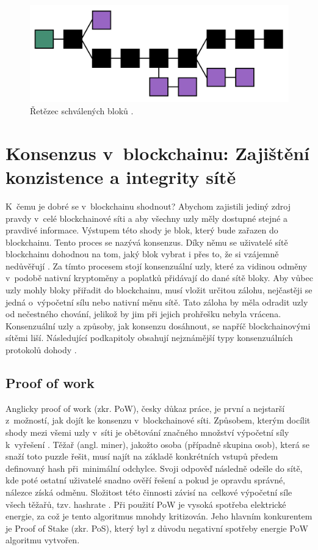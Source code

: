 \begin{figure}
\centering
\includegraphics[width=\textwidth]{obrazky/vetve_bloku.png}
\caption{Řetězec schválených bloků \cite{longestChain}.}
\label{fig:retezec}
\centering
\end{figure}

\section{Konsenzus v~blockchainu: Zajištění konzistence a integrity sítě} 
\label{konsenzus}
K~čemu je dobré se v~blockchainu shodnout? Abychom zajistili jediný zdroj pravdy v~celé blockchainové síti a aby všechny uzly měly dostupné stejné a pravdivé informace. Výstupem této shody je blok, který bude zařazen do blockchainu. Tento proces se nazývá konsenzus. Díky němu se uživatelé sítě blockchainu dohodnou na tom, jaký blok vybrat i přes to, že si vzájemně nedůvěřují \cite{Lashkar2021}. Za tímto procesem stojí konsenzuální uzly, které za vidinou odměny v~podobě nativní kryptoměny a poplatků přidávají do dané sítě bloky. Aby vůbec uzly mohly bloky přiřadit do blockchainu, musí vložit určitou zálohu, nejčastěji se jedná o~výpočetní sílu nebo nativní měnu sítě. Tato záloha by měla odradit uzly od nečestného chování, jelikož by jim při jejich prohřešku nebyla vrácena. Konsenzuální uzly a způsoby, jak konsenzu dosáhnout, se napříč blockchainovými sítěmi liší. Následující podkapitoly obsahují nejznámější typy konsenzuálních protokolů dohody \cite{Binance}.

\subsection{Proof of work}
Anglicky proof of work (zkr. PoW), česky důkaz práce, je první a nejstarší z~možností, jak dojít ke konsenzu v~blockchainové síti. Způsobem, kterým docílit shody mezi všemi uzly v~síti je obětování značného množství výpočetní síly k~vyřešení  \cite{POW}. Těžař (angl. miner), jakožto osoba (případně skupina osob), která se snaží toto puzzle řešit, musí najít na základě konkrétních vstupů předem definovaný hash při~minimální odchylce. Svoji odpověď následně odešle do sítě, kde poté ostatní uživatelé snadno ověří řešení a pokud je opravdu správné, nálezce získá odměnu. Složitost této činnosti závisí na~celkové výpočetní síle všech těžařů, tzv. hashrate \cite{POW_POS}. Při použití PoW je vysoká spotřeba elektrické energie, za což je tento algoritmus mnohdy kritizován. Jeho hlavním konkurentem je Proof of Stake (zkr. PoS), který byl z důvodu negativní spotřeby energie PoW algoritmu vytvořen. 

